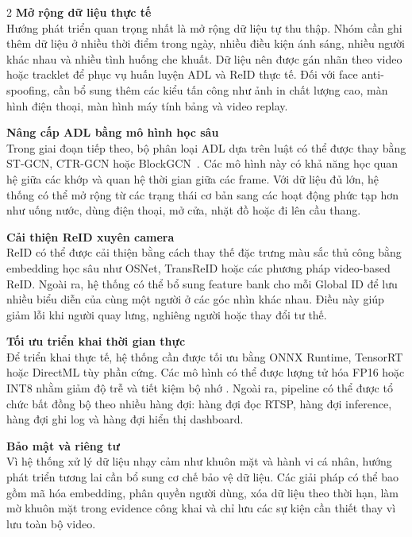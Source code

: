 \documentclass[a4paper, twoside, 12pt]{article}
\begin{document}
\begin{multicols}{2}
\hspace*{0.5cm}\textbf{Mở rộng dữ liệu thực tế}\\
Hướng phát triển quan trọng nhất là mở rộng dữ liệu tự thu thập. Nhóm cần ghi thêm dữ liệu ở nhiều thời điểm trong ngày, nhiều điều kiện ánh sáng, nhiều người khác nhau và nhiều tình huống che khuất. Dữ liệu nên được gán nhãn theo video hoặc tracklet để phục vụ huấn luyện ADL và ReID thực tế. Đối với face anti-spoofing, cần bổ sung thêm các kiểu tấn công như ảnh in chất lượng cao, màn hình điện thoại, màn hình máy tính bảng và video replay.

\vspace{0.1cm}
\hspace*{0.5cm}\textbf{Nâng cấp ADL bằng mô hình học sâu}\\
Trong giai đoạn tiếp theo, bộ phân loại ADL dựa trên luật có thể được thay bằng ST-GCN, CTR-GCN hoặc BlockGCN~\cite{yan2018stgcn,chen2021ctrgcn,zhou2024blockgcn}. Các mô hình này có khả năng học quan hệ giữa các khớp và quan hệ thời gian giữa các frame. Với dữ liệu đủ lớn, hệ thống có thể mở rộng từ các trạng thái cơ bản sang các hoạt động phức tạp hơn như uống nước, dùng điện thoại, mở cửa, nhặt đồ hoặc đi lên cầu thang.

\vspace{0.1cm}
\hspace*{0.5cm}\textbf{Cải thiện ReID xuyên camera}\\
ReID có thể được cải thiện bằng cách thay thế đặc trưng màu sắc thủ công bằng embedding học sâu như OSNet, TransReID hoặc các phương pháp video-based ReID. Ngoài ra, hệ thống có thể bổ sung feature bank cho mỗi Global ID để lưu nhiều biểu diễn của cùng một người ở các góc nhìn khác nhau. Điều này giúp giảm lỗi khi người quay lưng, nghiêng người hoặc thay đổi tư thế.

\vspace{0.1cm}
\hspace*{0.5cm}\textbf{Tối ưu triển khai thời gian thực}\\
Để triển khai thực tế, hệ thống cần được tối ưu bằng ONNX Runtime, TensorRT hoặc DirectML tùy phần cứng. Các mô hình có thể được lượng tử hóa FP16 hoặc INT8 nhằm giảm độ trễ và tiết kiệm bộ nhớ \cite{jacob2018quantization}. Ngoài ra, pipeline có thể được tổ chức bất đồng bộ theo nhiều hàng đợi: hàng đợi đọc RTSP, hàng đợi inference, hàng đợi ghi log và hàng đợi hiển thị dashboard.

\vspace{0.1cm}
\hspace*{0.5cm}\textbf{Bảo mật và riêng tư}\\
Vì hệ thống xử lý dữ liệu nhạy cảm như khuôn mặt và hành vi cá nhân, hướng phát triển tương lai cần bổ sung cơ chế bảo vệ dữ liệu. Các giải pháp có thể bao gồm mã hóa embedding, phân quyền người dùng, xóa dữ liệu theo thời hạn, làm mờ khuôn mặt trong evidence công khai và chỉ lưu các sự kiện cần thiết thay vì lưu toàn bộ video.



\end{multicols}
\end{document}
